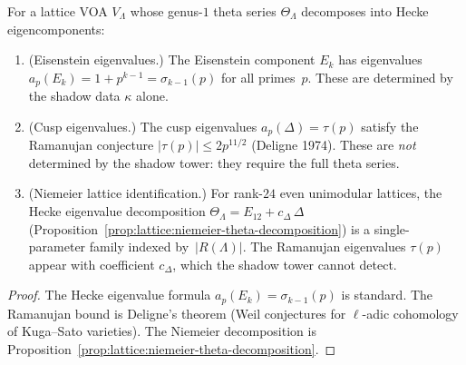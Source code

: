 \begin{proposition}%
\label{prop:hecke-eigenvalue-extraction}%
%
%
For a lattice VOA $V_\Lambda$ whose genus-$1$ theta series
$\Theta_\Lambda$ decomposes into Hecke eigencomponents:
\begin{enumerate}[label=\textup{(\roman*)}]
\item \textup{(Eisenstein eigenvalues.)}
The Eisenstein component $E_k$ has eigenvalues
$a_p(E_k) = 1 + p^{k-1} = \sigma_{k-1}(p)$
for all primes~$p$. These are determined by the
shadow data $\kappa$ alone.
\item \textup{(Cusp eigenvalues.)}
The cusp eigenvalues $a_p(\Delta) = \tau(p)$
satisfy the Ramanujan conjecture
$|\tau(p)| \leq 2p^{11/2}$ \textup{(}Deligne 1974\textup{)}.
These are \emph{not} determined by the shadow tower:
they require the full theta series.
\item \textup{(Niemeier lattice identification.)}
For rank-$24$ even unimodular lattices, the Hecke
eigenvalue decomposition
$\Theta_\Lambda = E_{12} + c_\Delta\,\Delta$
\textup{(}Proposition~\textup{\ref{prop:lattice:niemeier-theta-decomposition}}\textup{)}
is a single-parameter family indexed by~$|R(\Lambda)|$.
The Ramanujan eigenvalues $\tau(p)$ appear with
coefficient $c_\Delta$, which the shadow tower cannot
detect.
\end{enumerate}
\end{proposition}

\begin{proof}
The Hecke eigenvalue formula $a_p(E_k) = \sigma_{k-1}(p)$
is standard. The Ramanujan bound is Deligne's theorem
(Weil conjectures for $\ell$-adic cohomology of Kuga--Sato
varieties). The Niemeier decomposition is
Proposition~\ref{prop:lattice:niemeier-theta-decomposition}.
\end{proof}

